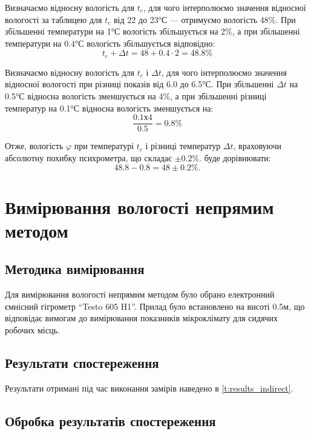 Визначаємо відносну вологість для $t_c$, для чого інтерполюємо значення відносної вологості
за таблицею для $t_c$ від 22 до 23°С --- отримуємо вологість 48\%. При збільшенні температури на 1°С
вологість збільшується на 2\%, а при збільшенні температури на 0.4°С вологість збільшується
відповідно:
\begin{equation}
  t_{\text{c}} + \Delta t  =  48 +  0.4 \cdot 2 = 48.8\%
\end{equation}

Визначаємо відносну вологість для $t_c$ і $\Delta t$, для чого інтерполюємо значення відносної
вологості при різниці показів від 6.0 до 6.5°С. При збільшенні $\Delta t$ на 0.5°С відносна
вологість зменшується на 4\%, а при збільшенні різниці температур на 0.1°С відносна вологість
зменшується на:
\begin{equation}
  \frac{0.1х4}{0.5}=0.8\%
\end{equation}

Отже, вологість $\varphi$ при температурі $t_c$ і різниці температур $\Delta t$, враховуючи
абсолютну похибку психрометра, що складає $\pm 0.2\%$. буде дорівнювати:
\begin{equation}
  48.8 - 0.8 = 48 \pm 0.2\%.
\end{equation}

\section{Вимірювання вологості непрямим методом}

\subsection{Методика вимірювання}

Для вимірювання вологості непрямим методом було обрано електронний ємнісний гігрометр ``Testo 605
H1''. Прилад було встановлено на висоті 0.5м, що відповідає вимогам до вимірювання показників
мікроклімату для сидячих робочих місць.

\subsection{Результати спостереження}

Результати отримані під час виконання замірів наведено в \ref{t:results_indirect}.
\pagebreak
\setlength{\mathindent}{0pt}

\pagebreak

\subsection{Обробка результатів спостереження}

